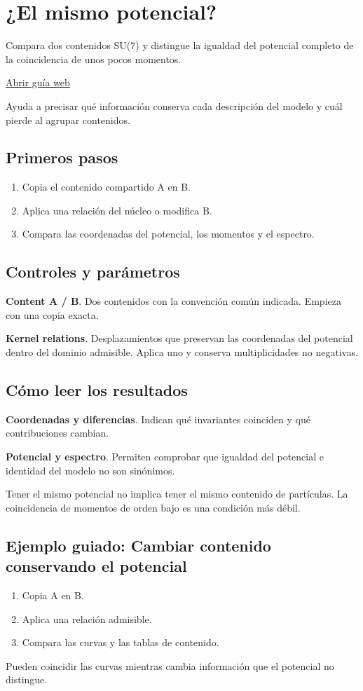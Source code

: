 \documentclass[11pt,a4paper]{article}
\begin{document}
\section{¿El mismo potencial?}
Compara dos contenidos SU(7) y distingue la igualdad del potencial completo de la coincidencia de unos pocos momentos.

\href{https://karlesmarin.github.io/ghu-explorer/guide/es/samepot/index.html}{Abrir guía web}

Ayuda a precisar qué información conserva cada descripción del modelo y cuál pierde al agrupar contenidos.
\subsection*{Primeros pasos}
\begin{enumerate}
\item Copia el contenido compartido A en B.
\item Aplica una relación del núcleo o modifica B.
\item Compara las coordenadas del potencial, los momentos y el espectro.
\end{enumerate}
\subsection*{Controles y parámetros}
\textbf{Content A / B}. Dos contenidos con la convención común indicada. Empieza con una copia exacta.

\textbf{Kernel relations}. Desplazamientos que preservan las coordenadas del potencial dentro del dominio admisible. Aplica uno y conserva multiplicidades no negativas.

\subsection*{Cómo leer los resultados}
\textbf{Coordenadas y diferencias}. Indican qué invariantes coinciden y qué contribuciones cambian.

\textbf{Potencial y espectro}. Permiten comprobar que igualdad del potencial e identidad del modelo no son sinónimos.

Tener el mismo potencial no implica tener el mismo contenido de partículas. La coincidencia de momentos de orden bajo es una condición más débil.
\subsection*{Ejemplo guiado: Cambiar contenido conservando el potencial}
\begin{enumerate}
\item Copia A en B.
\item Aplica una relación admisible.
\item Compara las curvas y las tablas de contenido.
\end{enumerate}
Pueden coincidir las curvas mientras cambia información que el potencial no distingue.
\end{document}
